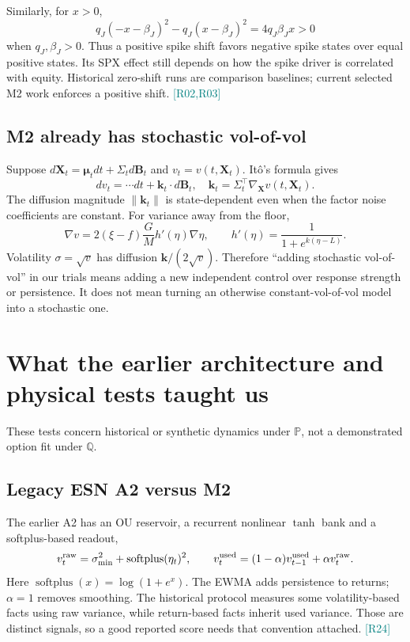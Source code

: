 \documentclass[11pt,a4paper]{article}
\newcommand{\splus}{\operatorname{softplus}}
\newcommand{\src}[1]{\textcolor{teal}{\small[#1]}}
\begin{document}
Similarly, for $x>0$,
\begin{equation}
q_J(-x-\beta_J)^2-q_J(x-\beta_J)^2=4q_J\beta_Jx>0
\end{equation}
when $q_J,\beta_J>0$. Thus a positive spike shift favors negative spike states over equal positive states. Its SPX effect still depends on how the spike driver is correlated with equity. Historical zero-shift runs are comparison baselines; current selected M2 work enforces a positive shift. \src{R02,R03}

\subsection{M2 already has stochastic vol-of-vol}
Suppose $d\mathbf X_t=\boldsymbol\mu_tdt+\Sigma_t d\mathbf B_t$ and $v_t=v(t,\mathbf X_t)$. It\^o's formula gives
\begin{equation}
dv_t=\cdots dt+\mathbf k_t\cdot d\mathbf B_t,
\quad \mathbf k_t=\Sigma_t^\top\nabla_{\mathbf X}v(t,\mathbf X_t).
\end{equation}
The diffusion magnitude $\|\mathbf k_t\|$ is state-dependent even when the factor noise coefficients are constant. For variance away from the floor,
\begin{equation}
\nabla v=2(\xi-f)\frac{G}{M}h'(\eta)\nabla\eta,
\qquad h'(\eta)=\frac1{1+e^{k(\eta-L)}}.
\end{equation}
Volatility $\sigma=\sqrt v$ has diffusion $\mathbf k/(2\sqrt v)$. Therefore ``adding stochastic vol-of-vol'' in our trials means adding a new independent control over response strength or persistence. It does not mean turning an otherwise constant-vol-of-vol model into a stochastic one.

\section{What the earlier architecture and physical tests taught us}
These tests concern historical or synthetic dynamics under $\mathbb P$, not a demonstrated option fit under $\mathbb Q$.

\subsection{Legacy ESN A2 versus M2}
The earlier A2 has an OU reservoir, a recurrent nonlinear $\tanh$ bank and a softplus-based readout,
\begin{equation}
v_t^{\rm raw}=\sigma_{\min}^2+\splus(\eta_t)^2,
\qquad v_t^{\rm used}=(1-\alpha)v_{t-1}^{\rm used}+\alpha v_t^{\rm raw}.
\end{equation}
Here $\splus(x)=\log(1+e^x)$. The EWMA adds persistence to returns; $\alpha=1$ removes smoothing. The historical protocol measures some volatility-based facts using raw variance, while return-based facts inherit used variance. Those are distinct signals, so a good reported score needs that convention attached. \src{R24}
\end{document}
